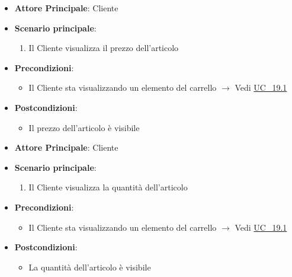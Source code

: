 \label{uc_19.1.2}
\begin{itemize}
    \item \textbf{Attore Principale}: Cliente
	\item \textbf{Scenario principale}: 
	\begin{enumerate}
		\item Il Cliente visualizza il prezzo dell'articolo
	\end{enumerate}
	\item \textbf{Precondizioni}: 
	\begin{itemize}
		\item Il Cliente sta visualizzando un elemento del carrello $\rightarrow$ Vedi \hyperref[uc_19.1]{UC\_19.1}
	\end{itemize}
	\item \textbf{Postcondizioni}:
	\begin{itemize}
		\item Il prezzo dell'articolo è visibile
	\end{itemize} 
\end{itemize}

\label{uc_19.1.3}
\begin{itemize}
    \item \textbf{Attore Principale}: Cliente
	\item \textbf{Scenario principale}: 
	\begin{enumerate}
		\item Il Cliente visualizza la quantità dell'articolo
	\end{enumerate}
	\item \textbf{Precondizioni}: 
	\begin{itemize}
		\item Il Cliente sta visualizzando un elemento del carrello $\rightarrow$ Vedi \hyperref[uc_19.1]{UC\_19.1}
	\end{itemize}
	\item \textbf{Postcondizioni}:
	\begin{itemize}
		\item La quantità dell'articolo è visibile
	\end{itemize} 
\end{itemize}